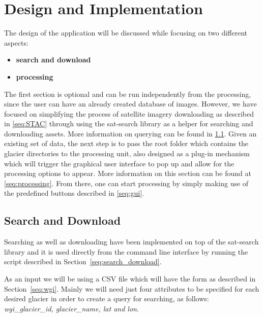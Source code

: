 \documentclass[12pt, a4paper]{report}
\begin{document}
	\newpage{}
	\chapter{Design and Implementation}
	\label{cha:design_and_implementation}
	
	\par The design of the application will be discussed while focusing on two different aspects:
	
	\begin{itemize}
		\item \textbf{search and download}
		\item \textbf{processing}
	\end{itemize}

	\par The first section is optional and can be run independently from the processing, since the user can have an already created database of images. However, we have focused on simplifying the process of satellite imagery downloading as described in \ref{seq:STAC} through using the sat-search library as a helper for searching and downloading assets. More information on querying can be found in \ref{seq:sd_implementation}. 
	Given an existing set of data, the next step is to pass the root folder which contains the glacier directories to the processing unit, also designed as a plug-in mechanism which will trigger the graphical user interface to pop up and allow for the processing options to appear. More information on this section can be found at \ref{seq:processing}. From there, one can start processing by simply making use of the predefined buttons described in \ref{seq:gui}.
	
		
	\section{Search and Download}
	\label{seq:sd_implementation}
		
	\par Searching as well as downloading have been implemented on top of the sat-search library and it is used directly from the command line interface by running the script described in Section~\ref{seq:search_download}.
	
	\par As an input we will be using a CSV file which will have the form as described in Section~\ref{seq:wgi}. Mainly we will need just four attributes to be specified for each desired glacier in order to create a query for searching, as follows: \textit{wgi\_glacier\_id, glacier\_name, lat and lon}.
	
\end{document}
